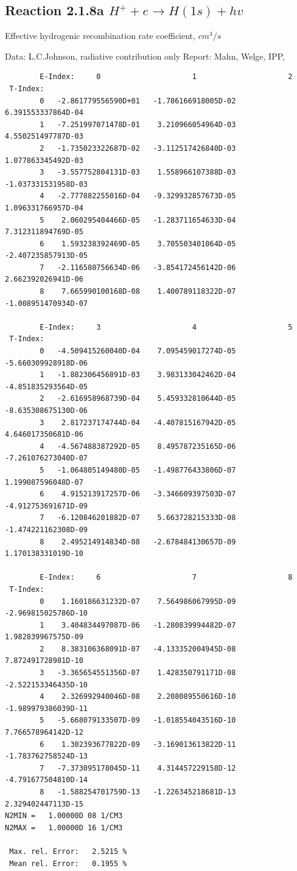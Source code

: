 \documentclass[12pt,dvipdfmx]{article}
\begin{document}
\subsection{
  Reaction 2.1.8a  $H^+ + e \rightarrow H(1s) + hv $
}

   Effective hydrogenic recombination rate coefficient, $cm^3/s$

   Data: L.C.Johnson, radiative contribution only
   Report: Mahn, Welge, IPP, \cite{kn:Mahn}


\begin{small}\begin{verbatim}
        E-Index:     0                     1                     2
 T-Index:
        0   -2.861779556590D+01   -1.786166918005D-02    6.391553337864D-04
        1   -7.251997071478D-01    3.210966054964D-03    4.550251497787D-03
        2   -1.735023322687D-02   -3.112517426840D-03    1.077863345492D-03
        3   -3.557752804131D-03    1.558966107388D-03   -1.037331531958D-03
        4   -2.777882255016D-04   -9.329932857673D-05    1.096331766957D-04
        5    2.060295404466D-05   -1.283711654633D-04    7.312311894769D-05
        6    1.593238392469D-05    3.705503401064D-05   -2.407235857913D-05
        7   -2.116580756634D-06   -3.854172456142D-06    2.662392026941D-06
        8    7.665990100168D-08    1.400789118322D-07   -1.008951470934D-07

        E-Index:     3                     4                     5
 T-Index:
        0   -4.509415260040D-04    7.095459017274D-05   -5.660309928918D-06
        1   -1.882306456891D-03    3.983133042462D-04   -4.851835293564D-05
        2   -2.616958968739D-04    5.459332810644D-05   -8.635308675130D-06
        3    2.817237174744D-04   -4.407815167942D-05    4.646017350681D-06
        4   -4.567488387292D-05    8.495787235165D-06   -7.261076273040D-07
        5   -1.064805149480D-05   -1.498776433806D-07    1.199087596048D-07
        6    4.915213917257D-06   -3.346609397503D-07   -4.912753691671D-09
        7   -6.120846201882D-07    5.663728215333D-08   -1.474221162308D-09
        8    2.495214914834D-08   -2.678484130657D-09    1.170138331019D-10

        E-Index:     6                     7                     8
 T-Index:
        0    1.160186631232D-07    7.564986067995D-09   -2.969815025786D-10
        1    3.404834497087D-06   -1.280839994482D-07    1.982839967575D-09
        2    8.383106368091D-07   -4.133352004945D-08    7.872491728981D-10
        3   -3.365654551356D-07    1.428350791171D-08   -2.522153346435D-10
        4    2.326992940046D-08    2.208089550616D-10   -1.989979386039D-11
        5   -5.668079133507D-09   -1.018554043516D-10    7.766578964142D-12
        6    1.302393677822D-09   -3.169013613822D-11   -1.783762758524D-13
        7   -7.373095178045D-11    4.314457229158D-12   -4.791677504810D-14
        8   -1.588254701759D-13   -1.226345218681D-13    2.329402447113D-15
N2MIN =   1.00000D 08 1/CM3
N2MAX =   1.00000D 16 1/CM3

 Max. rel. Error:   2.5215 %
 Mean rel. Error:   0.1955 %


\end{verbatim}\end{small}
\end{document}
